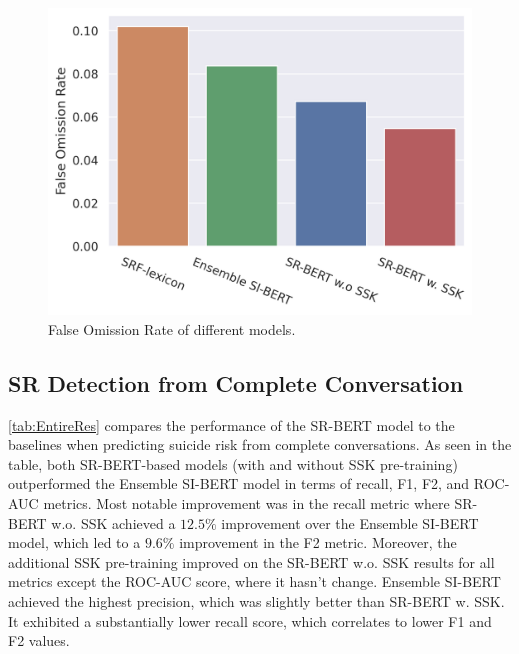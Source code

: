 \documentclass[letterpaper]{article} %
\begin{document}



\begin{figure}[]
\centering
\includegraphics[width=1.05\columnwidth]{figures/Omission_Rate.png}
\caption{False Omission Rate of different models.}
\label{fig:omission_rate}
\end{figure}


\subsection{SR Detection from Complete Conversation}

\autoref{tab:EntireRes} compares
the performance of the SR-BERT model to the baselines when predicting suicide risk from complete conversations.
As seen in the table, both SR-BERT-based models (with and without SSK pre-training) outperformed the Ensemble SI-BERT model in terms of recall, F1, F2, and ROC-AUC metrics. Most notable improvement was in the recall metric where SR-BERT w.o. SSK achieved a $12.5\%$ improvement over the Ensemble SI-BERT model, which led to a $9.6\%$ improvement in the F2 metric. Moreover, the additional SSK pre-training improved on the SR-BERT w.o. SSK results for all metrics except the ROC-AUC score, where it hasn't change.
Ensemble SI-BERT achieved the highest precision, which was slightly better than SR-BERT w. SSK. It exhibited a substantially lower recall score, which correlates to lower F1 and F2 values.
\end{document}
